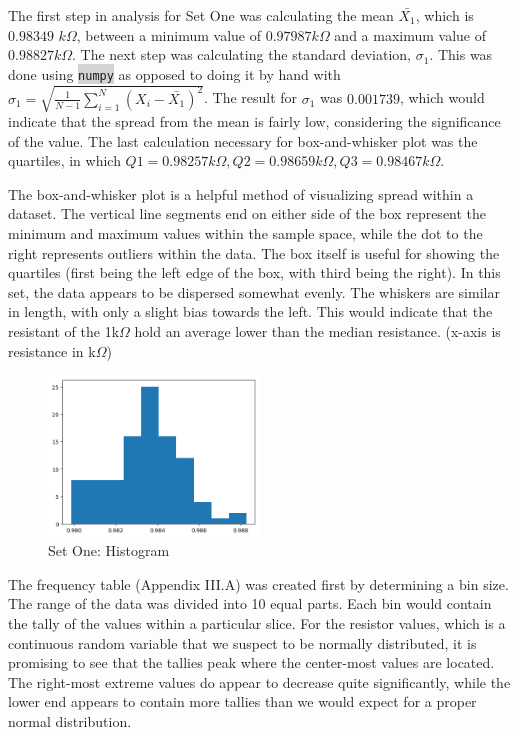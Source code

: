\documentclass[10pt]{report}
\newcommand{\inlinecode}[2]{\colorbox{lightgray}{\lstinline[language=#1]$#2$}}
\begin{document}
The first step in analysis for Set One was calculating the mean $\bar{X_1}$, which is  $0.98349$ $k\Omega$,
between a minimum value of $0.97987 k\Omega$ and a maximum value of $0.98827 k\Omega$. The next step was calculating
the standard deviation, $\sigma_1$. This was done using \inlinecode{Python}{numpy} as opposed
to doing it by hand with $\sigma_1 = \sqrt{\frac{1}{N-1} \sum_{i=1}^N (X_i - \bar{X_1})^2}$.
The result for $\sigma_1$ was $0.001739$, which would indicate that the spread from the mean is fairly low,
considering the significance of the value.
The last calculation necessary for box-and-whisker plot was the quartiles,
in which $Q1 = 0.98257 k\Omega, Q2 = 0.98659 k\Omega, Q3 = 0.98467 k\Omega$.


The box-and-whisker plot is a helpful method of visualizing spread within a dataset.
The vertical line segments end on either side of the box represent the minimum and maximum
values within the sample space, while the dot to the right represents outliers within the data.
The box itself is useful for showing the quartiles (first being the left edge of the box, with
third being the right).
In this set, the data appears to be dispersed somewhat evenly. The whiskers are similar in length,
with only a slight bias towards the left. This would indicate that the resistant of the 1k$\Omega$
hold an average lower than the median resistance. (x-axis is resistance in k$\Omega$)

\begin{figure}
	\centering
	\includegraphics[width=0.50\textwidth]{results/resistor_histogram}
	\caption{Set One: Histogram}
\end{figure}



The frequency table (Appendix III.A) was created first by determining a bin size. The range of the data was
divided into 10 equal parts. Each bin would contain the tally of the values within
a particular slice. For the resistor values, which is a continuous random variable that we
suspect to be normally distributed, it is promising to see that the tallies peak where the center-most values are located. 
The right-most extreme values do appear to decrease quite significantly, while
the lower end appears to contain more tallies than we would expect for a proper normal distribution.
\end{document}
